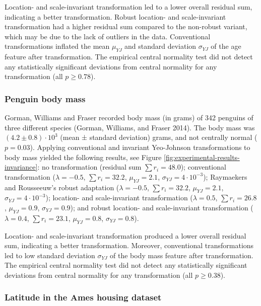 \documentclass[preprint,12pt,authoryear]{elsarticle}
\begin{document}
Location- and scale-invariant transformation led to a lower overall
residual sum, indicating a better transformation. Robust location- and
scale-invariant transformation had a higher residual sum compared to the
non-robust variant, which may be due to the lack of outliers in the
data. Conventional transformations inflated the mean \(\mu_{YJ}\) and
standard deviation \(\sigma_{YJ}\) of the age feature after
transformation. The empirical central normality test did not detect any
statistically significant deviations from central normality for any
transformation (all \(p \geq 0.78\)).

\subsubsection{Penguin body mass}\label{penguin-body-mass}

Gorman, Williams and Fraser recorded body mass (in grams) of 342
penguins of three different species (Gorman, Williams, and Fraser 2014).
The body mass was \((4.2 \pm 0.8) \cdot 10^3\) (mean ± standard
deviation) grams, and not centrally normal (\(p = 0.03\)). Applying
conventional and invariant Yeo-Johnson transformations to body mass
yielded the following results, see Figure
\ref{fig:experimental-results-invariance}: no transformation (residual
sum \(\sum r_i = 48.0\)); conventional transformation
(\(\lambda = -0.5\), \(\sum r_i = 32.2\), \(\mu_{YJ} = 2.1\),
\(\sigma_{YJ} = 4 \cdot 10^{-3}\)); Raymaekers and Rousseeuw's robust
adaptation (\(\lambda = -0.5\), \(\sum r_i = 32.2\), \(\mu_{YJ} = 2.1\),
\(\sigma_{YJ} = 4 \cdot 10^{-3}\)); location- and scale-invariant
transformation (\(\lambda = 0.5\), \(\sum r_i = 26.8\),
\(\mu_{YJ} = 0.9\), \(\sigma_{YJ} = 0.9\)); and robust location- and
scale-invariant transformation (\(\lambda = 0.4\), \(\sum r_i = 23.1\),
\(\mu_{YJ} = 0.8\), \(\sigma_{YJ} = 0.8\)).

Location- and scale-invariant transformation produced a lower overall
residual sum, indicating a better transformation. Moreover, conventional
transformations led to low standard deviation \(\sigma_{YJ}\) of the
body mass feature after transformation. The empirical central normality
test did not detect any statistically significant deviations from
central normality for any transformation (all \(p \geq 0.38\)).

\subsubsection{Latitude in the Ames housing
dataset}\label{latitude-in-the-ames-housing-dataset}
\end{document}
